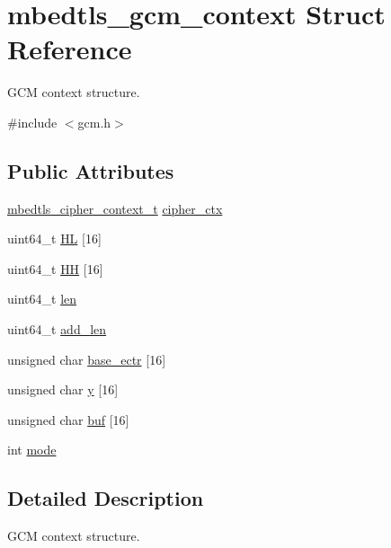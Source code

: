 \hypertarget{structmbedtls__gcm__context}{\section{mbedtls\-\_\-gcm\-\_\-context Struct Reference}
\label{structmbedtls__gcm__context}
}


G\-C\-M context structure.  




{\ttfamily \#include $<$gcm.\-h$>$}

\subsection*{Public Attributes}
\begin{DoxyCompactItemize}
\item 
\hyperlink{structmbedtls__cipher__context__t}{mbedtls\-\_\-cipher\-\_\-context\-\_\-t} \hyperlink{structmbedtls__gcm__context_a3687a336bb05c025fb3861ca99cd945d}{cipher\-\_\-ctx}
\item 
uint64\-\_\-t \hyperlink{structmbedtls__gcm__context_af5731ab9002f0b1b913e66071e1138fc}{H\-L} \mbox{[}16\mbox{]}
\item 
uint64\-\_\-t \hyperlink{structmbedtls__gcm__context_a5935337c8028cc6fec0c5b9c7d0d4fd8}{H\-H} \mbox{[}16\mbox{]}
\item 
uint64\-\_\-t \hyperlink{structmbedtls__gcm__context_a7ca348b10a75f1ab46f7c5067c1ab6e7}{len}
\item 
uint64\-\_\-t \hyperlink{structmbedtls__gcm__context_aabc65285117dd4b35998a328648faa20}{add\-\_\-len}
\item 
unsigned char \hyperlink{structmbedtls__gcm__context_a0ad9a8fb116959218c800b0bc3caeaba}{base\-\_\-ectr} \mbox{[}16\mbox{]}
\item 
unsigned char \hyperlink{structmbedtls__gcm__context_a1a7eb48ed5911aeb2dd983da6cfd32bb}{y} \mbox{[}16\mbox{]}
\item 
unsigned char \hyperlink{structmbedtls__gcm__context_a772f2b1c947e9a3631f55b241c421aca}{buf} \mbox{[}16\mbox{]}
\item 
int \hyperlink{structmbedtls__gcm__context_a48f2fbbac9f7bb46411fea24ac433628}{mode}
\end{DoxyCompactItemize}


\subsection{Detailed Description}
G\-C\-M context structure. 

